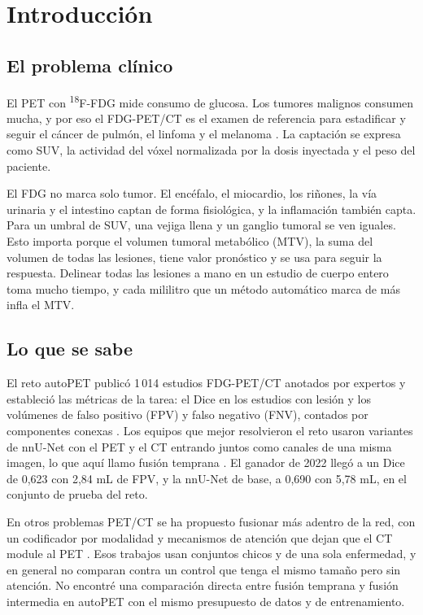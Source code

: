 \section{Introducción}

\subsection{El problema clínico}

El PET con \textsuperscript{18}F-FDG mide consumo de glucosa. Los tumores malignos consumen mucha, y por eso el FDG-PET/CT es el examen de referencia para estadificar y seguir el cáncer de pulmón, el linfoma y el melanoma \citep{boellaard2015}. La captación se expresa como SUV, la actividad del vóxel normalizada por la dosis inyectada y el peso del paciente.

El FDG no marca solo tumor. El encéfalo, el miocardio, los riñones, la vía urinaria y el intestino captan de forma fisiológica, y la inflamación también capta. Para un umbral de SUV, una vejiga llena y un ganglio tumoral se ven iguales. Esto importa porque el volumen tumoral metabólico (MTV), la suma del volumen de todas las lesiones, tiene valor pronóstico y se usa para seguir la respuesta. Delinear todas las lesiones a mano en un estudio de cuerpo entero toma mucho tiempo, y cada mililitro que un método automático marca de más infla el MTV.

\subsection{Lo que se sabe}

El reto autoPET publicó 1\,014 estudios FDG-PET/CT anotados por expertos y estableció las métricas de la tarea: el Dice en los estudios con lesión y los volúmenes de falso positivo (FPV) y falso negativo (FNV), contados por componentes conexas \citep{gatidis2022data,gatidis2024challenge}. Los equipos que mejor resolvieron el reto usaron variantes de nnU-Net \citep{isensee2021nnunet} con el PET y el CT entrando juntos como canales de una misma imagen, lo que aquí llamo fusión temprana \citep{isensee2023lookma,alloula2023}. El ganador de 2022 llegó a un Dice de 0,623 con 2,84 mL de FPV, y la nnU-Net de base, a 0,690 con 5,78 mL, en el conjunto de prueba del reto.

En otros problemas PET/CT se ha propuesto fusionar más adentro de la red, con un codificador por modalidad y mecanismos de atención que dejan que el CT module al PET \citep{fu2021,huang2025,zhao2024}. Esos trabajos usan conjuntos chicos y de una sola enfermedad, y en general no comparan contra un control que tenga el mismo tamaño pero sin atención. No encontré una comparación directa entre fusión temprana y fusión intermedia en autoPET con el mismo presupuesto de datos y de entrenamiento.

